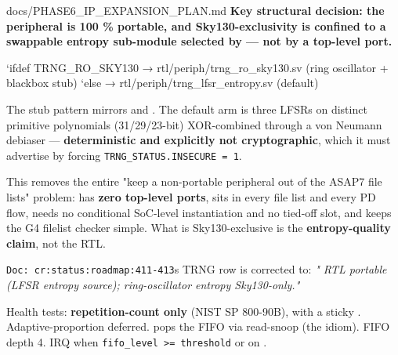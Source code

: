 \begin{relocated}{docs/PHASE6_IP_EXPANSION_PLAN.md}
\textbf{Key structural decision: the peripheral is 100 \% portable, and
Sky130-exclusivity is confined to a swappable entropy sub-module
selected by  --- not by a top-level port.}

\begin{textblock}
`ifdef TRNG_RO_SKY130  → rtl/periph/trng_ro_sky130.sv   (ring oscillator + blackbox stub)
`else                  → rtl/periph/trng_lfsr_entropy.sv (default)
\end{textblock}

The stub pattern mirrors
 and
. The default arm is three LFSRs on distinct
primitive polynomials (31/\allowbreak{}29/\allowbreak{}23-bit)
XOR-combined through a von Neumann debiaser --- \textbf{deterministic
and explicitly not cryptographic}, which it must advertise by forcing
\texttt{TRNG\_\allowbreak{}STATUS.\allowbreak{}INSECURE\ =\allowbreak{}\ 1}.

This removes the entire "keep a non-portable peripheral out of the ASAP7
file lists" problem:  has \textbf{zero top-level ports},
sits in every file list and every PD flow, needs no conditional
SoC-level instantiation and no tied-off slot, and keeps the G4 filelist
checker simple. What is Sky130-exclusive is the \textbf{entropy-quality
claim}, not the RTL.

\texttt{Doc:\allowbreak{}\ cr:\allowbreak{}status:\allowbreak{}roadmap:\allowbreak{}411-\allowbreak{}413}\textquotesingle s
TRNG row is corrected to: \emph{"\ok{} RTL portable (LFSR entropy
source); ring-oscillator entropy Sky130-only."}

Health tests: \textbf{repetition-count only} (NIST SP 800-90B), with a
sticky . Adaptive-proportion deferred.
 pops the FIFO via read-snoop (the  idiom).
FIFO depth 4. IRQ when
\texttt{fifo\_\allowbreak{}level\ >=\allowbreak{}\ threshold} or on
.


\end{relocated}
